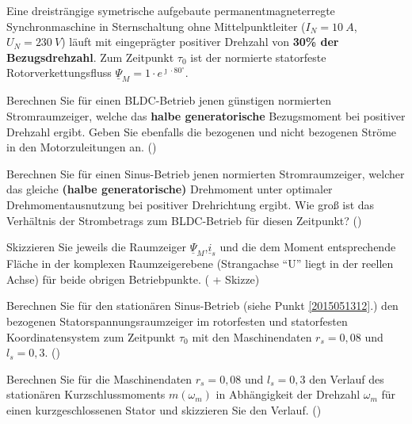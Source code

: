 \begin{question}[section=1,name={13.5.2015},mode=exm,type=bsp,tags={20150513}]
Eine dreisträngige symetrische aufgebaute permanentmagneterregte Synchronmaschine in Sternschaltung ohne Mittelpunktleiter ($I_N = 10~A$, $U_N= 230~V$) läuft mit eingeprägter positiver Drehzahl von \textbf{30\% der Bezugsdrehzahl}. Zum Zeitpunkt $\tau_0$ ist der normierte statorfeste Rotorverkettungsfluss $\underline{\Psi}_M = 1 \cdot e^{\jmath \cdot 80 ^\circ}$.
\begin{compactenum}
\item Berechnen Sie für einen BLDC-Betrieb jenen günstigen normierten Stromraumzeiger, welche das \textbf{halbe generatorische} Bezugsmoment bei positiver Drehzahl ergibt. Geben Sie ebenfalls die bezogenen und nicht bezogenen Ströme in den Motorzuleitungen an. ()
\item Berechnen Sie für einen Sinus-Betrieb jenen normierten Stromraumzeiger, welcher das gleiche \textbf{(halbe generatorische)} Drehmoment unter optimaler Drehmomentausnutzung bei positiver Drehrichtung ergibt. Wie groß ist das Verhältnis der Strombetrags zum BLDC-Betrieb für diesen Zeitpunkt? ()\label{2015051312}
\item Skizzieren Sie jeweils die Raumzeiger $\underline{\Psi}_M$,$\underline{i}_s$ und die dem Moment entsprechende Fläche in der komplexen Raumzeigerebene (Strangachse ``U'' liegt in der reellen Achse) für beide obrigen Betriebpunkte. ( + Skizze)
\item Berechnen Sie für den stationären Sinus-Betrieb (siehe Punkt \ref{2015051312}.) den bezogenen Statorspannungsraumzeiger im rotorfesten und statorfesten Koordinatensystem zum Zeitpunkt $\tau_0$ mit den Maschinendaten $r_s = 0,08$ und $l_s = 0,3$. ()
\item Berechnen Sie für die Maschinendaten $r_s=0,08$ und $l_s = 0,3$ den Verlauf des stationären Kurzschlussmoments $m(\omega_m)$ in Abhängigkeit der Drehzahl $\omega_m$ für einen kurzgeschlossenen Stator und skizzieren Sie den Verlauf. ()
\end{compactenum}
\end{question}
